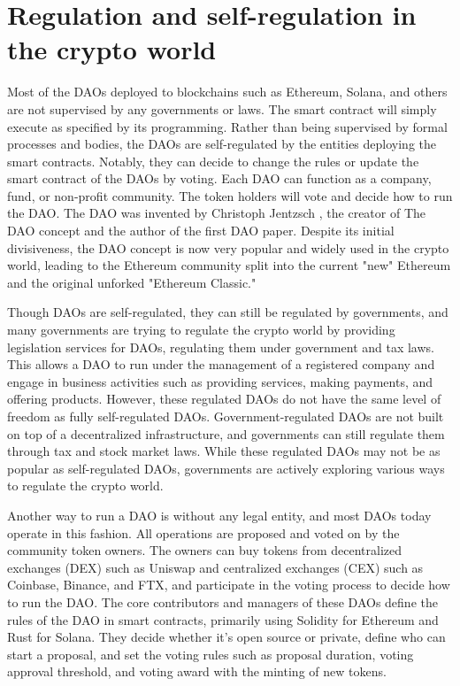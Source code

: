 \documentclass[main.tex]{subfiles}
\begin{document}
\section{Regulation and self-regulation in the crypto world}

Most of the DAOs deployed to blockchains such as Ethereum, Solana, and others are not supervised by any governments or laws. The smart contract will simply execute as specified by its programming. Rather than being supervised by formal processes and bodies, the DAOs are self-regulated by the entities deploying the smart contracts. Notably, they can decide to change the rules or update the smart contract of the DAOs by voting. Each DAO can function as a company, fund, or non-profit community. The token holders will vote and decide how to run the DAO. The DAO was invented by Christoph Jentzsch \cite{dao_paper}, the creator of The DAO concept and the author of the first DAO paper. Despite its initial divisiveness, the DAO concept is now very popular and widely used in the crypto world, leading to the Ethereum community split into the current "new" Ethereum and the original unforked "Ethereum Classic."

Though DAOs are self-regulated, they can still be regulated by governments, and many governments are trying to regulate the crypto world by providing legislation services for DAOs, regulating them under government and tax laws. This allows a DAO to run under the management of a registered company and engage in business activities such as providing services, making payments, and offering products. However, these regulated DAOs do not have the same level of freedom as fully self-regulated DAOs. Government-regulated DAOs are not built on top of a decentralized infrastructure, and governments can still regulate them through tax and stock market laws. While these regulated DAOs may not be as popular as self-regulated DAOs, governments are actively exploring various ways to regulate the crypto world.

Another way to run a DAO is without any legal entity, and most DAOs today operate in this fashion. All operations are proposed and voted on by the community token owners. The owners can buy tokens from decentralized exchanges (DEX) such as Uniswap and centralized exchanges (CEX) such as Coinbase, Binance, and FTX, and participate in the voting process to decide how to run the DAO. The core contributors and managers of these DAOs define the rules of the DAO in smart contracts, primarily using Solidity for Ethereum and Rust for Solana. They decide whether it's open source or private, define who can start a proposal, and set the voting rules such as proposal duration, voting approval threshold, and voting award with the minting of new tokens.
\end{document}
